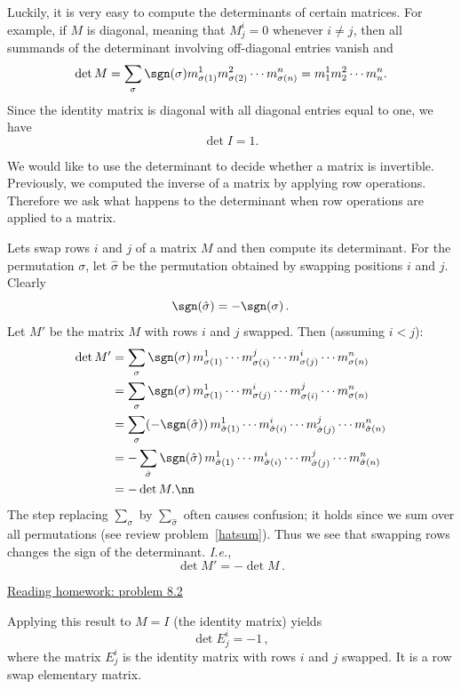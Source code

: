 Luckily, it is very easy to compute the determinants of certain matrices.  For example, if $M$ is diagonal, meaning that $M^i_j=0$ whenever $i\neq j$,  then all summands of the determinant involving off-diagonal entries vanish and 
\[
\det M = \sum_{\sigma} \sgn (\sigma) m^1_{\sigma(1)}m^2_{\sigma(2)}\cdots m^n_{\sigma(n)}= m^1_{1}m^2_{2}\cdots m^n_{n}.
\]
Since the identity matrix is diagonal with all diagonal entries equal to one, we have
\[
\det I=1.
\]

We would like to use the determinant to decide whether a matrix is invertible.  Previously, we computed the inverse of a matrix by applying row operations.  Therefore we ask what happens to the determinant when row operations are applied to a matrix.

\begin{remark}
Lets \hypertarget{rowswap}{swap}
 rows $i$ and $j$ of  a matrix $M$ and then compute its determinant.  For the permutation $\sigma$, let $\hat{\sigma}$ be the permutation obtained by swapping positions $i$ and $j$.  Clearly \[\sgn (\hat{\sigma})=-\sgn (\sigma)\, .\]  Let  $M'$ be the matrix $M$ with rows $i$ and $j$ swapped.  Then  (assuming $i<j$):
\begin{align}
\det M' & = \sum_{\sigma} \sgn (\sigma)\, m^1_{\sigma(1)}\cdots m^j_{\sigma(i)}\cdots m^i_{\sigma(j)} \cdots m^n_{\sigma(n)} \nonumber \\
& = \sum_{\sigma} \sgn (\sigma) \,m^1_{\sigma(1)}\cdots m^i_{\sigma(j)}\cdots m^j_{\sigma(i)} \cdots m^n_{\sigma(n)} \nonumber \\
& = \sum_{\sigma}(-\sgn (\hat{\sigma})) \,m^1_{\hat{\sigma}(1)}\cdots m^i_{\hat{\sigma}(i)}\cdots m^j_{\hat{\sigma}(j)} \cdots m^n_{\hat{\sigma}(n)} \nonumber \\
& = - \sum_{\hat{\sigma}} \sgn (\hat{\sigma}) \,m^1_{\hat{\sigma}(1)}\cdots m^i_{\hat{\sigma}(i)}\cdots m^j_{\hat{\sigma}(j)} \cdots m^n_{\hat{\sigma}(n)} \nonumber \\
& = -\det M.\nn
\end{align}
The step replacing $\sum_\sigma$ by $\sum_{\hat \sigma}$ often causes confusion; it holds since we sum over all permutations (see review problem~\ref{hatsum}).
Thus we see that swapping rows changes the sign of the determinant. {\itshape I.e.}, \[\det M' = - \det M\, .\]

\begin{center}\href{\webworkurl ReadingHomework8/2/}{Reading homework: problem 8.2}\end{center}

Applying this result to $M=I$ (the identity matrix) yields
\[\det E^i_j=-1\, ,\]
where the matrix $E^i_j$ is the identity matrix with rows $i$ and $j$ swapped. It is a row swap  elementary matrix.

\end{remark}

